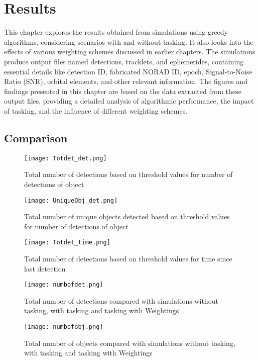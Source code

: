 \chapter{Results}
\label{sec:ergebnisse}
This chapter explores the results obtained from simulations using greedy algorithms, considering scenarios with and without tasking. It also looks into the effects of various weighting schemes discussed in earlier chapters. The simulations produce output files named detections, tracklets, and ephemerides, 
containing essential details like detection ID, fabricated NORAD ID, epoch, Signal-to-Noise Ratio (SNR), orbital elements, and other relevant information. The figures and findings presented in this chapter are based on the data extracted from these output files, providing a detailed analysis of algorithmic 
performance, the impact of tasking, and the influence of different weighting schemes.\\

\section{Comparison}

\begin{figure}[h!]
	\centering
	\texttt{[image: Totdet\_det.png]}
	\caption{Total number of detections based on threshold values for number of detections of object}\label{fig:}
\end{figure}

\begin{figure}[h!]
	\centering
	\texttt{[image: UniqueObj\_det.png]}
	\caption{Total number of unique objects detected based on threshold values for number of detections of object}\label{fig:}
\end{figure}

\begin{figure}[h!]
	\centering
	\texttt{[image: Totdet\_time.png]}
	\caption{Total number of detections based on threshold values for time since last detection}\label{fig:}
\end{figure}


\begin{figure}[h!]
	\centering
	\texttt{[image: numbofdet.png]}
	\caption{Total number of detections compared with simulations without tasking, with tasking and tasking with Weightings}\label{fig:}
\end{figure}

\begin{figure}[h!]
	\centering
	\texttt{[image: numbofobj.png]}
	\caption{Total number of objects compared with simulations without tasking, with tasking and tasking with Weightings}\label{fig:}
\end{figure}



